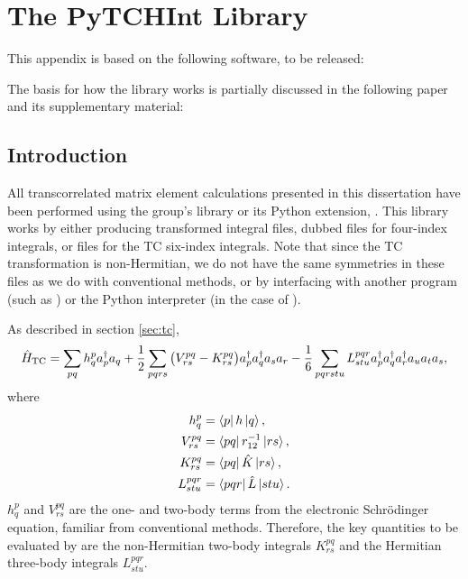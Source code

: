 \chapter{The PyTCHInt Library}
\label{chap:pytchint}

This appendix is based on the following software, to be released:\\

The basis for how the library works is partially discussed in the following paper and its supplementary material: \\

\section{Introduction}

All transcorrelated matrix element calculations presented in this dissertation have been performed using the group's \tchint library or its Python extension, \pytchint. This library works by either producing transformed integral files, dubbed \fcidump files for four-index integrals,\supercite{knowlesDeterminant1989} or \tcdump files for the \gls{TC} six-index integrals. Note that since the \gls{TC} transformation is non-Hermitian, we do not have the same symmetries in these files as we do with conventional methods, or by interfacing with another program (such as \neci) or the Python interpreter (in the case of \pytchint).

As described in section \ref{sec:tc},
\begin{equation}
    \hat H_\mathrm{TC} = \sum_{pq} h_q^p a_p^\dagger a_q
    + \frac{1}{2} \sum_{pqrs} \big(V_{rs}^{pq} - K_{rs}^{pq}\big)
    a_p^\dagger a_q^\dagger a_s a_r
    - \frac{1}{6} \sum_{pqrstu} L_{stu}^{pqr}
    a_p^\dagger a_q^\dagger a_r^\dagger a_u a_t a_s,
\end{equation}
where
\begin{equation}
\begin{split}
    h_q^p &= \bra{p}h\ket{q}, \\
    V_{rs}^{pq} &= \bra{p q } r_{12}^{-1} \ket{ r s}, \\
    K_{rs}^{pq} &= \bra{p q } \hat{K} \ket{ r s}, \\
    L_{stu}^{pqr} &= \bra{p q r } \hat{L} \ket{s t u}.
\end{split}
\end{equation}
$h_q^p$ and $V_{rs}^{pq}$ are the one- and two-body terms from the electronic Schr\"odinger equation, familiar from conventional methods. Therefore, the key quantities to be evaluated by \tchint are the non-Hermitian two-body integrals $K_{rs}^{pq}$ and the Hermitian three-body integrals $L_{stu}^{pqr}$.

